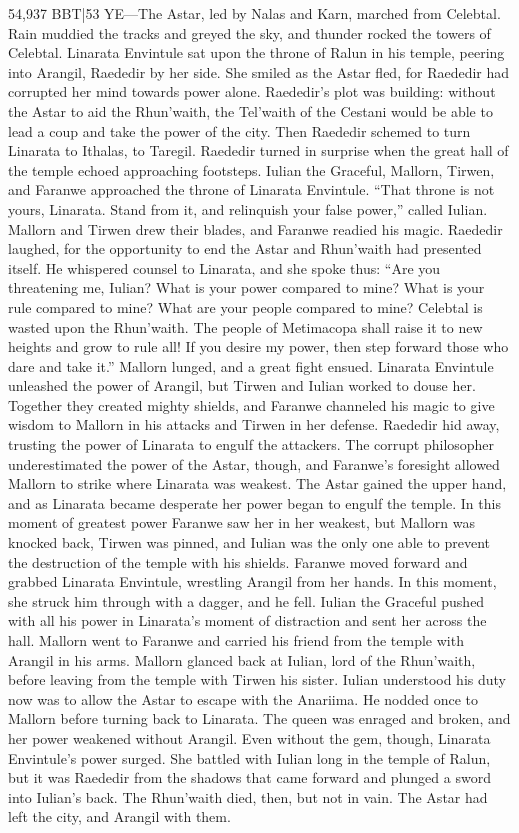 \documentclass[smalldemyvopaper,11pt,twoside,onecolumn,openright,extrafontsizes]{memoir}
\begin{document}
54,937 BBT|53 YE—The Astar, led by Nalas and Karn, marched from Celebtal. Rain muddied the tracks and greyed the sky, and thunder rocked the towers of Celebtal. Linarata Envintule sat upon the throne of Ralun in his temple, peering into Arangil, Raededir by her side. She smiled as the Astar fled, for Raededir had corrupted her mind towards power alone. Raededir’s plot was building: without the Astar to aid the Rhun’waith, the Tel’waith of the Cestani would be able to lead a coup and take the power of the city. Then Raededir schemed to turn Linarata to Ithalas, to Taregil. Raededir turned in surprise when the great hall of the temple echoed approaching footsteps.
	Iulian the Graceful, Mallorn, Tirwen, and Faranwe approached the throne of Linarata Envintule.
	“That throne is not yours, Linarata. Stand from it, and relinquish your false power,” called Iulian. Mallorn and Tirwen drew their blades, and Faranwe readied his magic.
	Raededir laughed, for the opportunity to end the Astar and Rhun’waith had presented itself. He whispered counsel to Linarata, and she spoke thus:
	“Are you threatening me, Iulian? What is your power compared to mine? What is your rule compared to mine? What are your people compared to mine? Celebtal is wasted upon the Rhun’waith. The people of Metimacopa shall raise it to new heights and grow to rule all! If you desire my power, then step forward those who dare and take it.”
	Mallorn lunged, and a great fight ensued. Linarata Envintule unleashed the power of Arangil, but Tirwen and Iulian worked to douse her. Together they created mighty shields, and Faranwe channeled his magic to give wisdom to Mallorn in his attacks and Tirwen in her defense. Raededir hid away, trusting the power of Linarata to engulf the attackers. The corrupt philosopher underestimated the power of the Astar, though, and Faranwe’s foresight allowed Mallorn to strike where Linarata was weakest. The Astar gained the upper hand, and as Linarata became desperate her power began to engulf the temple. In this moment of greatest power Faranwe saw her in her weakest, but Mallorn was knocked back, Tirwen was pinned, and Iulian was the only one able to prevent the destruction of the temple with his shields. Faranwe moved forward and grabbed Linarata Envintule, wrestling Arangil from her hands. In this moment, she struck him through with a dagger, and he fell. Iulian the Graceful pushed with all his power in Linarata’s moment of distraction and sent her across the hall. Mallorn went to Faranwe and carried his friend from the temple with Arangil in his arms. Mallorn glanced back at Iulian, lord of the Rhun’waith, before leaving from the temple with Tirwen his sister. Iulian understood his duty now was to allow the Astar to escape with the Anariima. He nodded once to Mallorn before turning back to Linarata. The queen was enraged and broken, and her power weakened without Arangil. Even without the gem, though, Linarata Envintule’s power surged. She battled with Iulian long in the temple of Ralun, but it was Raededir from the shadows that came forward and plunged a sword into Iulian’s back. The Rhun’waith died, then, but not in vain. The Astar had left the city, and Arangil with them.
\end{document}
